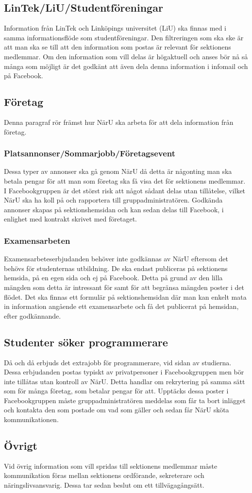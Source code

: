 \documentclass{datateknologsektionen-document}
\begin{document}
\subsection{LinTek/LiU/Studentföreningar}
Information från LinTek och Linköpings universitet (LiU) ska finnas med i samma
informationsflöde som studentföreningar. Den filtreringen som ska ske är att man ska se till
att den information som postas är relevant för sektionens medlemmar. Om den information
som vill delas är högaktuell och anses bör nå så många som möjligt är det godkänt att även
dela denna information i infomail och på Facebook.
\subsection{Företag}
Denna paragraf rör främst hur NärU ska arbeta för att dela information från företag.
\subsubsection{Platsannonser/Sommarjobb/Företagsevent}
Dessa typer av annonser ska gå genom NärU då detta är någonting man ska betala pengar för
att man som företag ska få visa det för sektionens medlemmar. I Facebookgruppen är det
störst risk att något sådant delas utan tillåtelse, vilket NärU ska ha koll på och rapportera till
gruppadministratören. Godkända annonser skapas på sektionshemsidan och kan sedan delas
till Facebook, i enlighet med kontrakt skrivet med företaget.
\subsubsection{Examensarbeten}
Examensarbeteserbjudanden behöver inte godkännas av NärU eftersom det behövs för
studenternas utbildning. De ska endast publiceras på sektionens hemsida, på en egen sida och
ej på Facebook. Detta på grund av den lilla mängden som detta är intressant för samt för att
begränsa mängden poster i det flödet. Det ska finnas ett formulär på sektionshemsidan där
man kan enkelt mata in information angående ett examensarbete och få det publicerat på
hemsidan, efter godkännande.
\subsection{Studenter söker programmerare}
Då och då erbjuds det extrajobb för programmerare, vid sidan av studierna. Dessa
erbjudanden postas typiskt av privatpersoner i Facebookgruppen men bör inte tillåtas utan
kontroll av NärU. Detta handlar om rekrytering på samma sätt som för många företag, som
betalar pengar för att. Upptäcks dessa poster i Facebookgruppen måste gruppadministratören
meddelas som får ta bort inlägget och kontakta den som postade om vad som gäller och sedan
får NärU sköta kommunikationen.
\subsection{Övrigt}
Vid övrig information som vill spridas till sektionens medlemmar måste kommunikation föras
mellan sektionens ordförande, sekreterare och näringslivsansvarig. Dessa tar sedan beslut om
ett tillvägagångsätt.
\end{document}
